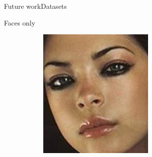 \begin{frame}{Future work}{Datasets}
    \begin{block}{Faces only}
        \begin{figure}
            \centering
            \begin{subfigure}[b]{0.15\textwidth}
                \centering
                \includegraphics[width=\textwidth]{sections/malte_slides/crop5}
            \end{subfigure}
            \begin{subfigure}[b]{0.15\textwidth}
                \centering

\end{subfigure}
\end{figure}
\end{block}
\end{frame}
